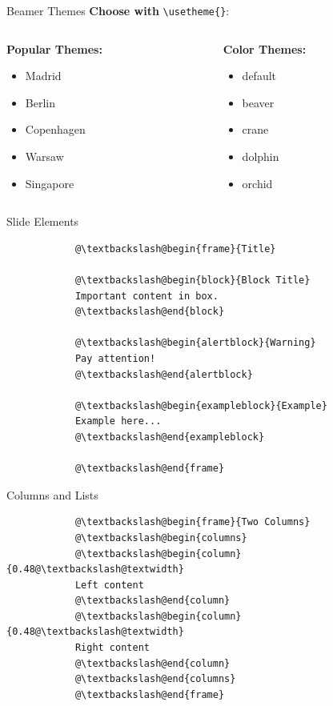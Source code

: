 \documentclass[aspectratio=169]{beamer}
\begin{document}
	\begin{frame}{Beamer Themes}
		\textbf{Choose with} \texttt{\textbackslash usetheme\{\}}:
		
		\begin{columns}
			\begin{column}{0.48\textwidth}
				\textbf{Popular Themes:}
				\begin{itemize}
					\item Madrid
					\item Berlin
					\item Copenhagen
					\item Warsaw
					\item Singapore
				\end{itemize}
			\end{column}
			
			\begin{column}{0.48\textwidth}
				\textbf{Color Themes:}
				\begin{itemize}
					\item default
					\item beaver
					\item crane
					\item dolphin
					\item orchid
				\end{itemize}
			\end{column}
		\end{columns}
	\end{frame}
	
	\begin{frame}[fragile]{Slide Elements}
		\begin{lstlisting}
			@\textbackslash@begin{frame}{Title}
			
			@\textbackslash@begin{block}{Block Title}
			Important content in box.
			@\textbackslash@end{block}
			
			@\textbackslash@begin{alertblock}{Warning}
			Pay attention!
			@\textbackslash@end{alertblock}
			
			@\textbackslash@begin{exampleblock}{Example}
			Example here...
			@\textbackslash@end{exampleblock}
			
			@\textbackslash@end{frame}
		\end{lstlisting}
	\end{frame}
	
	\begin{frame}[fragile]{Columns and Lists}
		\begin{lstlisting}
			@\textbackslash@begin{frame}{Two Columns}
			@\textbackslash@begin{columns}
			@\textbackslash@begin{column}{0.48@\textbackslash@textwidth}
			Left content
			@\textbackslash@end{column}
			@\textbackslash@begin{column}{0.48@\textbackslash@textwidth}
			Right content
			@\textbackslash@end{column}
			@\textbackslash@end{columns}
			@\textbackslash@end{frame}
		\end{lstlisting}
	\end{frame}
	
\end{document}
